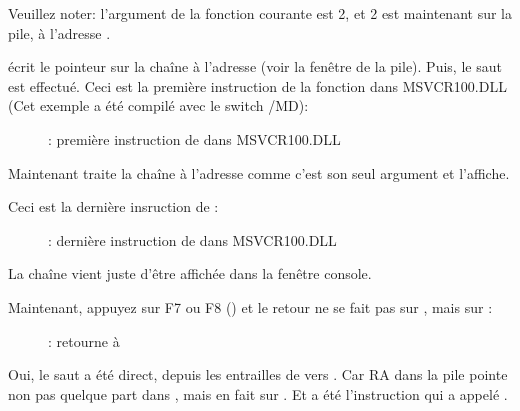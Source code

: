 Veuillez noter: l'argument de la fonction courante est 2, et 2 est maintenant
sur la pile, à l'adresse .

\clearpage
\MOV écrit le pointeur sur la chaîne à l'adresse  (voir la fenêtre de la pile).
Puis, le saut est effectué.
Ceci est la première instruction de la fonction \printf dans MSVCR100.DLL (Cet exemple
a été compilé avec le switch /MD):

\begin{figure}[H]
\centering
{}
\caption{\olly: première instruction de \printf dans MSVCR100.DLL}
\label{fig:switch_few_olly6}
\end{figure}

Maintenant \printf traite la chaîne à l'adresse  comme c'est son
seul argument et l'affiche.

\clearpage
Ceci est la dernière insruction de \printf:

\begin{figure}[H]
\centering
{}
\caption{\olly: dernière instruction de \printf dans MSVCR100.DLL}
\label{fig:switch_few_olly7}
\end{figure}

La chaîne  vient juste d'être affichée dans la fenêtre console.

\clearpage
Maintenant, appuyez sur F7 ou F8 (\stepover) et le retour ne se fait pas sur \ttf,
mais sur \main:

\begin{figure}[H]
\centering
{}
\caption{\olly: retourne à \main}
\label{fig:switch_few_olly8}
\end{figure}

Oui, le saut a été direct, depuis les entrailles de \printf vers \main.
Car \ac{RA} dans la pile pointe non pas quelque part dans \ttf, mais en fait sur
\main.
Et \CALL {} a été l'instruction qui a appelé \ttf.
